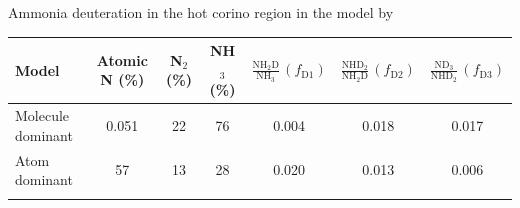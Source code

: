 \documentclass[12pt,a4paper]{article}  %
\begin{document}
\begin{center}
\begin{threeparttable}[tbh]
\caption[]{Ammonia deuteration in the hot corino region in the model by \citet{Furuya18}}
\begin{tabular}{lcccccc}
\hline \noalign {\smallskip}
Model  & Atomic N (\%) & N$_2$ (\%) & NH$_3$ (\%) & $\frac{\mathrm{NH_2D}}{\mathrm{NH_3}}\,(f_\mathrm{D1})$ & $\frac{\mathrm{NHD_2}}{\mathrm{NH_2D}}\,(f_\mathrm{D2})$ &
$\frac{\mathrm{ND_3}}{\mathrm{NHD_2}}\,(f_\mathrm{D3})$\\
\hline \noalign {\smallskip}
Molecule dominant & 0.051 & 22 & 76 & 0.004 & 0.018 & 0.017 \\
Atom dominant & 57 & 13 & 28 & 0.020 & 0.013 & 0.006 \\
\hline \noalign {\smallskip}
\end{tabular}
\label{tab:model}
\end{threeparttable}
\end{center}












\end{document}
